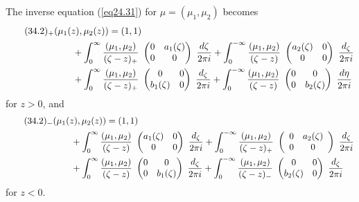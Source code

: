 \documentclass{surv-l}
\theoremstyle{plain}
\theoremstyle{definition}
\numberwithin{equation}{chapter}
\begin{document}
The inverse equation (\ref{eq24.31}) for $\mu=(\mu_{1},\mu_{2})$ becomes
\setcounter{equation}{1}
\begin{align*}
\tag*{$(34.2)_{+}$}
&(\mu_{1}(z), \mu_{2}(z))=(1, 1)\\\nonumber
&\qquad +\int_{0}^{\infty}\frac{(\mu_{1},\mu_{2})}{(\zeta-z)_{+}}\ \left(\begin{array}{@{}cc@{}}
0 & a_{1}(\zeta)\\
0 & 0
\end{array}\right)\ \frac{d{\zeta}}{2\pi i}+\int_{0}^{-\infty}\frac{(\mu_{1},\mu_{2})}{(\zeta-z)}\ \left(\begin{array}{@{}cc@{}}
a_{2}(\zeta) & 0\\
0 & 0
\end{array}\right)\ \frac{d_{\zeta}}{2\pi i}\\ \nonumber
&\qquad +\int_{0}^{\infty}\frac{(\mu_{1},\mu_{2})}{(\zeta-z)_{+}}\ \left(\begin{array}{@{}cc@{}}
0 & 0\\
b_{1}(\zeta) & 0
\end{array}\right)\ \frac{d_{\zeta}}{2\pi i}+\int_{0}^{-\infty}\frac{(\mu_{1},\mu_{2})}{(\zeta-z)}\ \left(\begin{array}{@{}cc@{}}
0 & 0\\
0 & b_{2}(\zeta)
\end{array}\right)\ \frac{d\eta}{2\pi i} \nonumber
\end{align*}
for $z>0$, and
\begin{align*}
\tag*{$(34.2)_{-}$}
&(\mu_{1}(z), \mu_{2}(z))=(1, 1)\\
&\qquad+\int_{0}^{\infty}\frac{(\mu_{1},\mu_{2})}{(\zeta-z)}\ \left(\begin{array}{@{}cc@{}}
a_{1}(\zeta) & 0\\
0 & 0
\end{array}\right)\ \frac{d_{\zeta}}{2\pi i}+\int_{0}^{-\infty}\frac{(\mu_{1},\mu_{2})}{(\zeta-z)_{+}}\ \left(\begin{array}{lc}
0 & a_{2}(\zeta)\\
0 & 0
\end{array}\right)\ \frac{d_{\zeta}}{2\pi i}\\ \nonumber
&\qquad+\int_{0}^{\infty}\frac{(\mu_{1},\mu_{2})}{(\zeta-z)}\ \left(\begin{array}{@{}cc@{}}
0 & 0\\
0 & b_{1}(\zeta)
\end{array}\right)\ \frac{d_{\zeta}}{2\pi i}+\int_{0}^{-\infty}\frac{(\mu_{1},\mu_{2})}{(\zeta-z)_{-}}\ \left(\begin{array}{@{}cc@{}}
0 & 0\\
b_{2}(\zeta) & 0
\end{array}\right)\ \frac{d_{\zeta}}{2\pi i} \nonumber
\end{align*}
for $z<0$.
\end{document}
